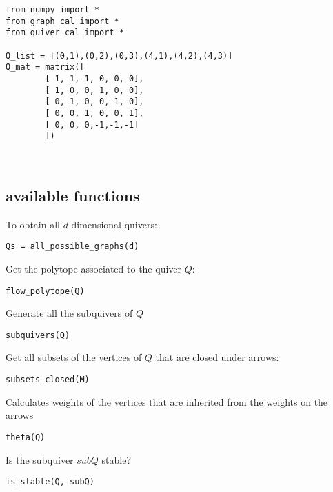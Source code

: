 \documentclass{article}
\begin{document}
\begin{minipage}{0.65\textwidth}
\begin{Verbatim}
from numpy import *
from graph_cal import *
from quiver_cal import *

Q_list = [(0,1),(0,2),(0,3),(4,1),(4,2),(4,3)]
Q_mat = matrix([
        [-1,-1,-1, 0, 0, 0],
        [ 1, 0, 0, 1, 0, 0],
        [ 0, 1, 0, 0, 1, 0],
        [ 0, 0, 1, 0, 0, 1],
        [ 0, 0, 0,-1,-1,-1]
        ])

\end{Verbatim}
\end{minipage}~
\begin{minipage}{0.3\textwidth}
\end{minipage}

\subsection{available functions}
To obtain all $d$-dimensional quivers: 
\begin{Verbatim}
Qs = all_possible_graphs(d)
\end{Verbatim}
Get the polytope associated to the quiver $Q$: 
\begin{Verbatim}
flow_polytope(Q)
\end{Verbatim}
Generate all the subquivers of $Q$
\begin{Verbatim}
subquivers(Q)
\end{Verbatim}
Get all subsets of the vertices of $Q$ that are closed under arrows:
\begin{Verbatim}
subsets_closed(M)
\end{Verbatim}
Calculates weights of the vertices that are inherited from the weights on the arrows
\begin{Verbatim}
theta(Q)
\end{Verbatim}
Is the subquiver $subQ$ stable? 
\begin{Verbatim}
is_stable(Q, subQ)
\end{Verbatim}
\end{document}
